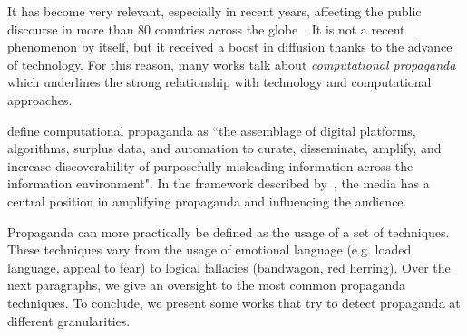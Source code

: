 It has become very relevant, especially in recent years, affecting the public discourse in more than 80 countries across the globe~\citep{bradshaw2021industrialized}.
It is not a recent phenomenon by itself, but it received a boost in diffusion thanks to the advance of technology.
For this reason, many works talk about \emph{computational propaganda} which underlines the strong relationship with technology and computational approaches.

\citet{hassan2023} define computational propaganda as ``the assemblage of digital platforms, algorithms, surplus data, and automation to curate, disseminate, amplify,
and increase discoverability of purposefully misleading information across the information
environment".
In the framework described by~\citet{hassan2023}, the media has a central position in amplifying propaganda and influencing the audience.

Propaganda can more practically be defined as the usage of a set of techniques. These techniques vary from the usage of emotional language (e.g. loaded language, appeal to fear) to logical fallacies (bandwagon, red herring).
%
Over the next paragraphs, %
we give an oversight to the most common propaganda techniques.
To conclude, we present some works that try to detect propaganda at different granularities.



